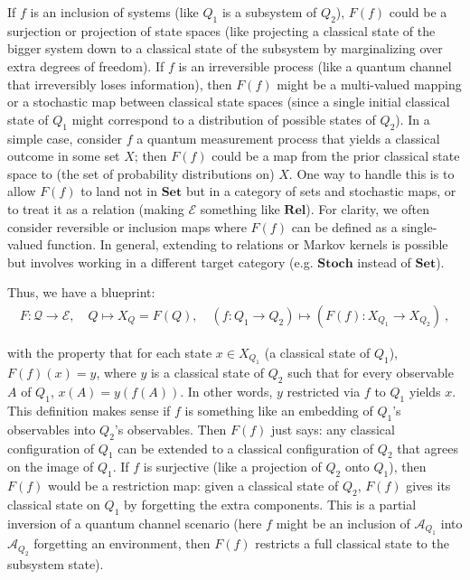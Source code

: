 If $f$ is an inclusion of systems (like $Q_1$ is a subsystem of $Q_2$), $F(f)$ could be a surjection or projection of state spaces (like projecting a classical state of the bigger system down to a classical state of the subsystem by marginalizing over extra degrees of freedom). If $f$ is an irreversible process (like a quantum channel that irreversibly loses information), then $F(f)$ might be a multi-valued mapping or a stochastic map between classical state spaces (since a single initial classical state of $Q_1$ might correspond to a distribution of possible states of $Q_2$). In a simple case, consider $f$ a quantum measurement process that yields a classical outcome in some set $X$; then $F(f)$ could be a map from the prior classical state space to (the set of probability distributions on) $X$. One way to handle this is to allow $F(f)$ to land not in $\mathbf{Set}$ but in a category of sets and stochastic maps, or to treat it as a relation (making $\mathcal{E}$ something like $\mathbf{Rel}$). For clarity, we often consider reversible or inclusion maps where $F(f)$ can be defined as a single-valued function. In general, extending to relations or Markov kernels is possible but involves working in a different target category (e.g. $\mathbf{Stoch}$ instead of $\mathbf{Set}$).

\medskip

Thus, we have a blueprint:
\begin{align}
F: \mathcal{Q} \to \mathcal{E}, \quad Q \mapsto X_Q = F(Q), \quad (f: Q_1 \to Q_2) \mapsto (F(f): X_{Q_1} \to X_{Q_2})~,
\end{align}

with the property that for each state $x \in X_{Q_1}$ (a classical state of $Q_1$), $F(f)(x) = y$, where $y$ is a classical state of $Q_2$ such that for every observable $A$ of $Q_1$, $x(A) = y(f(A))$. In other words, $y$ restricted via $f$ to $Q_1$ yields $x$. This definition makes sense if $f$ is something like an embedding of $Q_1$'s observables into $Q_2$'s observables. Then $F(f)$ just says: any classical configuration of $Q_1$ can be extended to a classical configuration of $Q_2$ that agrees on the image of $Q_1$. If $f$ is surjective (like a projection of $Q_2$ onto $Q_1$), then $F(f)$ would be a restriction map: given a classical state of $Q_2$, $F(f)$ gives its classical state on $Q_1$ by forgetting the extra components. This is a partial inversion of a quantum channel scenario (here $f$ might be an inclusion of $\mathcal{A}_{Q_1}$ into $\mathcal{A}_{Q_2}$ forgetting an environment, then $F(f)$ restricts a full classical state to the subsystem state).

